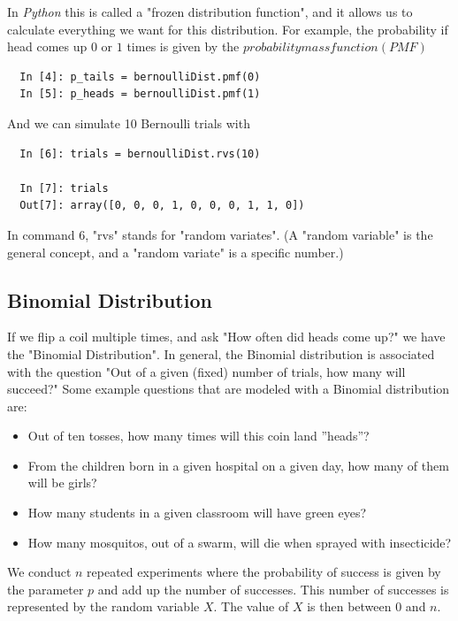 In \emph{Python} this is called a "frozen distribution function", and it allows us to calculate everything we want for this distribution. For example, the probability if head comes up $0$ or $1$ times is given by the $probability mass function (PMF)$

\begin{lstlisting}
  In [4]: p_tails = bernoulliDist.pmf(0)
  In [5]: p_heads = bernoulliDist.pmf(1)
\end{lstlisting}

And we can simulate 10 Bernoulli trials with

\begin{lstlisting}
  In [6]: trials = bernoulliDist.rvs(10)

  In [7]: trials
  Out[7]: array([0, 0, 0, 1, 0, 0, 0, 1, 1, 0])
\end{lstlisting}

In command $6$, "rvs" stands for "random variates". (A "random variable" is the general concept, and a "random variate" is a specific number.)

\subsection{Binomial Distribution}\label{sec:binomialDist}

If we flip a coil multiple times, and ask "How often did heads come up?" we have the "Binomial Distribution". In general, the Binomial distribution is associated with the question "Out of a given (fixed) number of trials, how many will succeed?" Some example questions that are modeled with a Binomial distribution are:
\begin{itemize}
  \item Out of ten tosses, how many times will this coin land ''heads''?
  \item From the children born in a given hospital on a given day, how many of them will be girls?
  \item How many students in a given classroom will have green eyes?
  \item How many mosquitos, out of a swarm, will die when sprayed with insecticide?
\end{itemize}

We conduct $n$ repeated experiments where the probability of success is given by the parameter $p$ and add up the number of successes. This number of successes is represented by the random variable $X$.  The value of $X$ is then between 0 and $n$.

